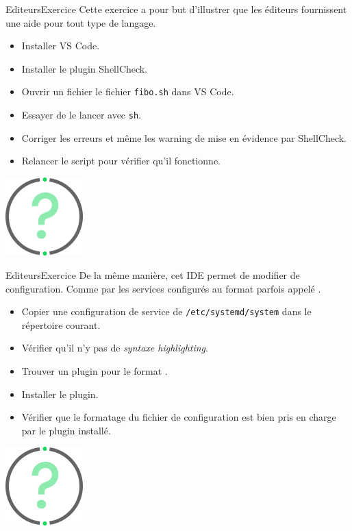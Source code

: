 \documentclass{beamer}
\begin{document}
    \begin{frame}{Editeurs}{Exercice \execcounterdispinc}
        Cette exercice a pour but d'illustrer que les éditeurs fournissent une aide pour tout type de langage.
        \begin{itemize}
            \item Installer VS Code.
            \item Installer le plugin ShellCheck.
            \item Ouvrir un fichier le fichier \lstinline{fibo.sh} dans VS Code.
            \item Essayer de le lancer avec \lstinline{sh}.
            \item Corriger les erreurs et même les warning de mise en évidence par ShellCheck.
            \item Relancer le script pour vérifier qu'il fonctionne.
        \end{itemize}
        \bigbreak
        \centering
        \includegraphics[width=3cm]{image/question-mark}
    \end{frame}

    \begin{frame}{Editeurs}{Exercice \execcounterdispinc}
        De la même manière, cet IDE permet de modifier de configuration.
        Comme par les services configurés au format parfois appelé .
        \begin{itemize}
            \item Copier une configuration de service de \lstinline{/etc/systemd/system} dans le répertoire courant.
            \item Vérifier qu'il n'y pas de \textit{syntaxe highlighting}.
            \item Trouver un plugin pour le format .
            \item Installer le plugin.
            \item Vérifier que le formatage du fichier de configuration est bien pris en charge par le plugin installé.
        \end{itemize}
        \bigbreak
        \centering
        \includegraphics[width=3cm]{image/question-mark}
    \end{frame}
\end{document}
